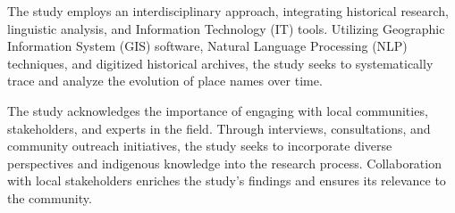 The study employs an interdisciplinary approach, integrating historical research, linguistic analysis, and Information Technology (IT) tools. Utilizing Geographic Information System (GIS) software, Natural Language Processing (NLP) techniques, and digitized historical archives, the study seeks to systematically trace and analyze the evolution of place names over time.


The study acknowledges the importance of engaging with local communities, stakeholders, and experts in the field. Through interviews, consultations, and community outreach initiatives, the study seeks to incorporate diverse perspectives and indigenous knowledge into the research process. Collaboration with local stakeholders enriches the study's findings and ensures its relevance to the community.



